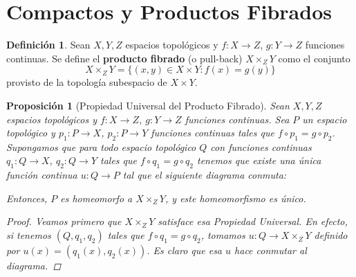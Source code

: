 \documentclass[12pt]{book}
\newtheorem{prop}[teo]{Proposición}
\theoremstyle{definition}
\newtheorem{defn}[teo]{Definición}
\begin{document}
\section{Compactos y Productos Fibrados}

\begin{defn}
Sean $X,Y,Z$ espacios topológicos y $f:X\to Z$, $g:Y\to Z$ funciones continuas. Se define el \textbf{producto fibrado} (o pull-back) $X\times_Z Y$ como el conjunto $$X\times_Z Y = \{(x,y)\in X\times Y : f(x)=g(y)\}$$ provisto de la topología subespacio de $X\times Y$.
\end{defn}

\begin{prop}[Propiedad Universal del Producto Fibrado]
Sean $X,Y,Z$ espacios topológicos y $f:X\to Z$, $g:Y\to Z$ funciones continuas. Sea $P$ un espacio topológico y $p_1:P\to X$, $p_2:P\to Y$ funciones continuas tales que $f\circ p_1 = g\circ p_2$. Supongamos que para todo espacio topológico $Q$ con funciones continuas $q_1:Q\to X$, $q_2:Q\to Y$ tales que $f\circ q_1 = g\circ q_2$ tenemos que existe una única función continua $u:Q\to P$ tal que el siguiente diagrama conmuta:
\begin{center}
\end{center}
Entonces, $P$ es homeomorfo a $X\times_Z Y$, y este homeomorfismo es único.
\begin{proof}
Veamos primero que $X\times_Z Y$ satisface esa Propiedad Universal. En efecto, si tenemos $(Q,q_1,q_2)$ tales que $f\circ q_1 = g\circ q_2$, tomamos $u:Q\to X\times_Z Y$ definido por $u(x) = (q_1(x),q_2(x))$. Es claro que esa $u$ hace conmutar al diagrama.


\end{proof}
\end{prop}
\end{document}
